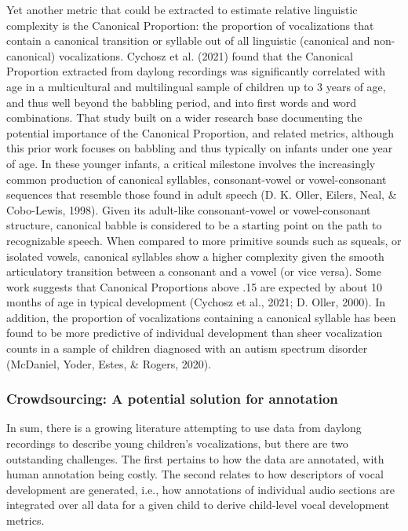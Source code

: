 \documentclass[
  english,
  ,man]{apa6}
\begin{document}
Yet another metric that could be extracted to estimate relative linguistic complexity is the Canonical Proportion: the proportion of vocalizations that contain a canonical transition or syllable out of all linguistic (canonical and non-canonical) vocalizations. Cychosz et al. (2021) found that the Canonical Proportion extracted from daylong recordings was significantly correlated with age in a multicultural and multilingual sample of children up to 3 years of age, and thus well beyond the babbling period, and into first words and word combinations. That study built on a wider research base documenting the potential importance of the Canonical Proportion, and related metrics, although this prior work focuses on babbling and thus typically on infants under one year of age. In these younger infants, a critical milestone involves the increasingly common production of canonical syllables, consonant-vowel or vowel-consonant sequences that resemble those found in adult speech (D. K. Oller, Eilers, Neal, \& Cobo-Lewis, 1998). Given its adult-like consonant-vowel or vowel-consonant structure, canonical babble is considered to be a starting point on the path to recognizable speech. When compared to more primitive sounds such as squeals, or isolated vowels, canonical syllables show a higher complexity given the smooth articulatory transition between a consonant and a vowel (or vice versa). Some work suggests that Canonical Proportions above .15 are expected by about 10 months of age in typical development (Cychosz et al., 2021; D. Oller, 2000). In addition, the proportion of vocalizations containing a canonical syllable has been found to be more predictive of individual development than sheer vocalization counts in a sample of children diagnosed with an autism spectrum disorder (McDaniel, Yoder, Estes, \& Rogers, 2020).

\hypertarget{crowdsourcing-a-potential-solution-for-annotation}{%
\subsubsection{Crowdsourcing: A potential solution for annotation}\label{crowdsourcing-a-potential-solution-for-annotation}}

In sum, there is a growing literature attempting to use data from daylong recordings to describe young children's vocalizations, but there are two outstanding challenges. The first pertains to how the data are annotated, with human annotation being costly. The second relates to how descriptors of vocal development are generated, i.e., how annotations of individual audio sections are integrated over all data for a given child to derive child-level vocal development metrics.
\end{document}
